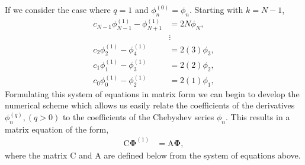 \documentclass[a4paper, 12pt, twoside, openright]{article}
\numberwithin{equation}{section}
\begin{document}
If we consider the case where $q=1$ and $\phi_n^{(0)} = \phi_n$. Starting with $k=N-1$,
\begin{align}
c_{N-1}\phi_{N-1}^{(1)}-\phi_{N+1}^{(1)} &= 2N\phi_N, \nonumber\\
&\vdots \nonumber\\
c_{2}\phi_{2}^{(1)}-\phi_{4}^{(1)} &= 2(3)\phi_3,\nonumber\\
c_{1}\phi_{1}^{(1)}-\phi_{3}^{(1)} &= 2(2)\phi_2,\nonumber\\
c_{0}\phi_{0}^{(1)}-\phi_{2}^{(1)} &= 2(1)\phi_1,
\end{align}
Formulating this system of equations in matrix form we can begin to develop the numerical scheme which allows us easily relate the coefficients of the derivatives $\phi_n^{(q)}, (q>0)$ to the coefficients of the Chebyshev series $\phi_n$. This results in a matrix equation of the form,
\begin{align}
\mathrm{C}\mathbf{\Phi}^{(1)} &= \mathrm{A}\mathbf{\Phi},
\end{align}
 where the matrix $\mathrm{C}$ and $\mathrm{A}$ are defined below from the system of equations above. 
\end{document}

